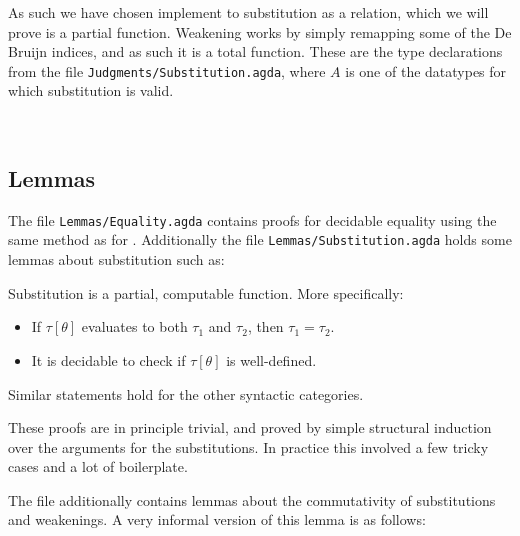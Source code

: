 As such we have chosen implement to substitution as a relation, which we will
prove is a partial function. Weakening works by simply remapping some of the De
Bruijn indices, and as such it is a total function. These are the type
declarations from the file \texttt{Judgments/Substitution.agda}, where $A$ is
one of the datatypes for which substitution is valid.

\begin{code}
\>[2]\<[4]%
\>[4] \AgdaSymbol{:}       \<%
\\
\>[2]\<[4]%
\>[4] \AgdaSymbol{:}         \<%
\end{code}

\subsection{Lemmas}

The file \texttt{Lemmas/Equality.agda} contains proofs for decidable equality
using the same method as for \ATALe. Additionally the file
\texttt{Lemmas/Substitution.agda} holds some lemmas about substitution such as:

\begin{lemma}
  \label{lemma:computsubst}
  Substitution is a partial, computable function. More specifically:
  \begin{itemize}
  \item If $\tau[\theta]$ evaluates to both $\tau_1$ and $\tau_2$, then
    $\tau_1 = \tau_2$.
  \item It is decidable to check if $\tau[\theta]$ is well-defined.
  \end{itemize}

  Similar statements hold for the other syntactic categories.
\end{lemma}

These proofs are in principle trivial, and proved by simple structural induction
over the arguments for the substitutions. In practice this involved a few tricky
cases and a lot of boilerplate.

The file additionally contains lemmas about the commutativity of substitutions
and weakenings. A very informal version of this lemma is as follows:

